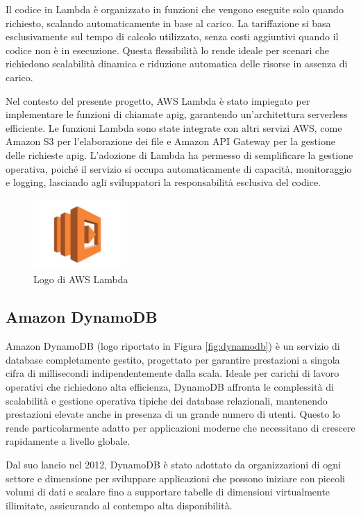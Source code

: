 Il codice in Lambda è organizzato in funzioni che vengono eseguite solo quando richiesto, scalando automaticamente in base al carico. La tariffazione si basa esclusivamente sul tempo di calcolo utilizzato, senza costi aggiuntivi quando il codice non è in esecuzione. Questa flessibilità lo rende ideale per scenari che richiedono scalabilità dinamica e riduzione automatica delle risorse in assenza di carico.

Nel contesto del presente progetto, AWS Lambda è stato impiegato per implementare le funzioni di chiamate \gls{apig}, garantendo un'architettura serverless efficiente. Le funzioni Lambda sono state integrate con altri servizi AWS, come Amazon S3 per l'elaborazione dei file e Amazon API Gateway per la gestione delle richieste \gls{apig}. L'adozione di Lambda ha permesso di semplificare la gestione operativa, poiché il servizio si occupa automaticamente di capacità, monitoraggio e logging, lasciando agli sviluppatori la responsabilità esclusiva del codice.


\begin{figure}[h]
  \centering
  \includegraphics[width=0.3\textwidth]{img/tecnologie/AWS_Lambda.png}
  \caption{Logo di AWS Lambda}
  \label{fig:lambda}
\end{figure}

\subsection{Amazon DynamoDB}
Amazon DynamoDB (logo riportato in Figura \ref{fig:dynamodb}) è un servizio di database  completamente gestito, progettato per garantire prestazioni a singola cifra di millisecondi indipendentemente dalla scala. Ideale per carichi di lavoro operativi che richiedono alta efficienza, DynamoDB affronta le complessità di scalabilità e gestione operativa tipiche dei database relazionali, mantenendo prestazioni elevate anche in presenza di un grande numero di utenti. Questo lo rende particolarmente adatto per applicazioni moderne che necessitano di crescere rapidamente a livello globale.

Dal suo lancio nel 2012, DynamoDB è stato adottato da organizzazioni di ogni settore e dimensione per sviluppare applicazioni che possono iniziare con piccoli volumi di dati e scalare fino a supportare tabelle di dimensioni virtualmente illimitate, assicurando al contempo alta disponibilità.

